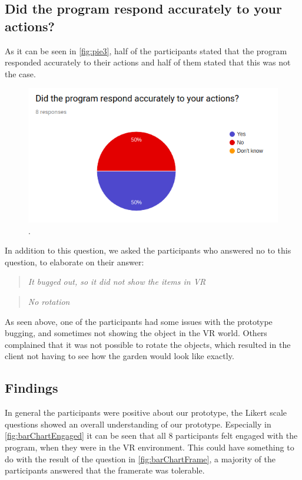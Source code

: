 \subsection*{Did the program respond accurately to your actions?}
As it can be seen in \autoref{fig:pie3}, half of the participants stated that the program responded accurately to their actions and half of them stated that this was not the case.

\begin{figure}[H]
	\centering
	\includegraphics[width=0.9\linewidth]{figure/Evaluation/pie3.png}
	\caption{.}
	\label{fig:pie3}
\end{figure}

In addition to this question, we asked the participants who answered no to this question, to elaborate on their answer:\\

\begin{quote}
	\textit{It bugged out, so it did not show the items in VR}\\
\end{quote}

\begin{quote}
	\textit{No rotation}\\
\end{quote}

As seen above, one of the participants had some issues with the prototype bugging, and sometimes not showing the object in the VR world. Others complained that it was not possible to rotate the objects, which resulted in the client not having to see how the garden would look like exactly.


\subsection{Findings}
In general the participants were positive about our prototype, the Likert scale questions showed an overall understanding of our prototype.
Especially in \autoref{fig:barChartEngaged} it can be seen that all 8 participants felt engaged with the program, when they were in the VR environment. This could have something to do with the result of the question in \autoref{fig:barChartFrame}, a majority of the participants answered that the framerate was tolerable.\\


